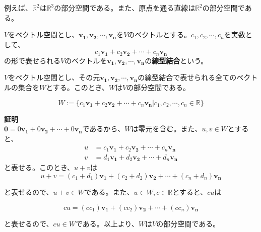 \documentclass{jlreq}
\begin{document}
例えば、$\mathbb{R}^2$は$\mathbb{R}^3$の部分空間である。また、原点を通る直線は$\mathbb{R}^2$の部分空間である。

\begin{definitionbox}
  $V$をベクトル空間とし、$\boldsymbol{v_1}, \boldsymbol{v_2}, \cdots, \boldsymbol{v_n}$を$V$のベクトルとする。$c_1, c_2, \cdots, c_n$を実数として、
  \begin{equation*}
    c_1 \boldsymbol{v_1} + c_2 \boldsymbol{v_2} + \cdots + c_n \boldsymbol{v_n}
  \end{equation*}
  の形で表せられる$V$のベクトルを$\boldsymbol{v_1}, \boldsymbol{v_2}, \cdots, \boldsymbol{v_n}$の\textbf{線型結合}という。 \\
\end{definitionbox}

\begin{theorembox}[定理1]
  $V$をベクトル空間とし、その元$\boldsymbol{v_1}, \boldsymbol{v_2}, \cdots, \boldsymbol{v_n}$の線型結合で表せられる全てのベクトルの集合を$W$とする。このとき、$W$は$V$の部分空間である。

  \begin{equation*}
    W := \{ c_1 \boldsymbol{v_1} + c_2 \boldsymbol{v_2} + \cdots + c_n \boldsymbol{v_n} | c_1, c_2, \cdots, c_n \in \mathbb{R} \}
  \end{equation*}

  \dotfill

  \textbf{証明} \\

  $\boldsymbol{0} = 0 \boldsymbol{v_1} + 0 \boldsymbol{v_2} + \cdots + 0 \boldsymbol{v_n}$であるから、$W$は零元を含む。また、$u, v \in W$とすると、
  \begin{align*}
    u &= c_1 \boldsymbol{v_1} + c_2 \boldsymbol{v_2} + \cdots + c_n \boldsymbol{v_n} \\
    v &= d_1 \boldsymbol{v_1} + d_2 \boldsymbol{v_2} + \cdots + d_n \boldsymbol{v_n}
  \end{align*}
  と表せる。このとき、$u + v$は
  \begin{equation*}
    u + v = (c_1 + d_1) \boldsymbol{v_1} + (c_2 + d_2) \boldsymbol{v_2} + \cdots + (c_n + d_n) \boldsymbol{v_n}
  \end{equation*}

  と表せるので、$u + v \in W$である。また、$u \in W, c \in \mathbb{R}$とすると、$cu$は

  \begin{equation*}
    cu = (cc_1) \boldsymbol{v_1} + (cc_2) \boldsymbol{v_2} + \cdots + (cc_n) \boldsymbol{v_n}
  \end{equation*}

  と表せるので、$cu \in W$である。以上より、$W$は$V$の部分空間である。
\end{theorembox}
\end{document}
